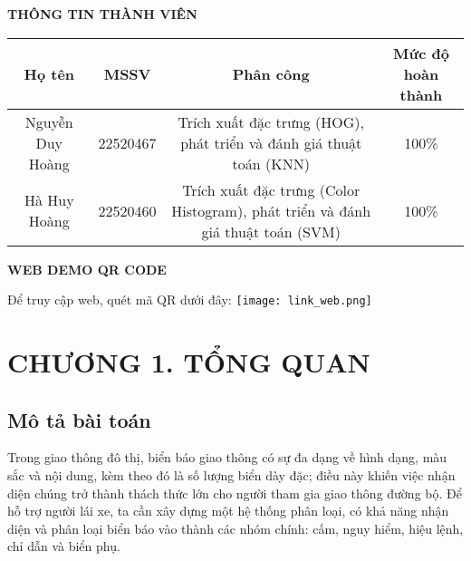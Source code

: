 \documentclass[a4paper,12pt]{article}
\begin{document}
\newpage
\thispagestyle{empty}
\begin{center}
    \textbf{\large THÔNG TIN THÀNH VIÊN}  %
\end{center}

\begin{center}
\begin{tabular}{|c|c|c|c|}
\hline
\textbf{Họ tên} & \textbf{MSSV} & \textbf{Phân công} & \textbf{Mức độ hoàn thành} \\
\hline
Nguyễn Duy Hoàng & 22520467 & \parbox{5cm}{\centering Trích xuất đặc trưng (HOG), phát triển và đánh giá thuật toán (KNN)} & 100\% \\
\hline
Hà Huy Hoàng & 22520460 & \parbox{5cm}{\centering Trích xuất đặc trưng (Color Histogram), phát triển và đánh giá thuật toán (SVM)} & 100\% \\
\hline
\end{tabular}
\end{center}

\newpage
\begin{center}
    \textbf{\large WEB DEMO QR CODE}  %
\end{center}
\begin{center}
    Để truy cập web, quét mã QR dưới đây:
    \texttt{[image: link\_web.png]}
\end{center}

\newpage
\setcounter{page}{1}
\pagestyle{plain}
\section*{\centering CHƯƠNG 1. TỔNG QUAN}
\vspace{1cm}
\setcounter{section}{1}
\subsection{Mô tả bài toán}
\hspace{5mm}Trong giao thông đô thị, biển báo giao thông có sự đa dạng về hình dạng, màu sắc và nội dung, kèm theo đó là số lượng biển dày đặc; điều này khiến việc nhận diện chúng trở thành thách thức lớn cho người tham gia giao thông đường bộ. Để hỗ trợ người lái xe, ta cần xây dựng một hệ thống phân loại, có khả năng nhận diện và phân loại biển báo vào thành các nhóm chính: cấm, nguy hiểm, hiệu lệnh, chỉ dẫn và biển phụ.
\end{document}
